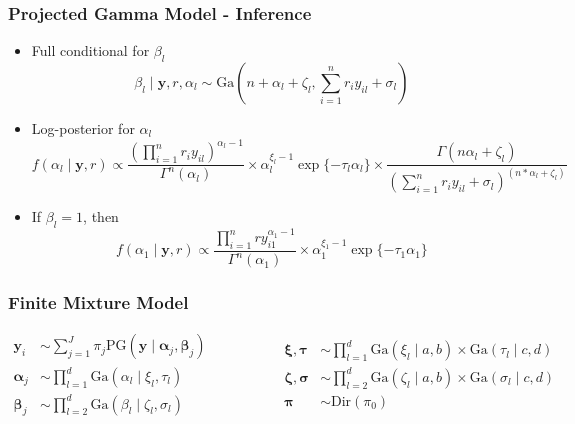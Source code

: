 \documentclass[aspectratio=169]{beamer}
\begin{document}
\begin{frame}
  \frametitle{Projected Gamma Model - Inference}
  \begin{itemize}
    \item Full conditional for $\beta_l$
      \begin{equation*}
        \beta_l\mid \bm{ y}, r, \alpha_l \sim \text{Ga}\left(n + \alpha_l + \zeta_l,
                {\textstyle \sum}_{i = 1}^nr_iy_{il} + \sigma_l\right)
      \end{equation*}
    \pause
    \item Log-posterior for $\alpha_l$
      \begin{equation*}
        f(\alpha_l \mid \bm{ y}, r) \propto
          \frac{\left({\textstyle \prod}_{i = 1}^nr_iy_{il}\right)^{\alpha_l - 1}}{
            \Gamma^n(\alpha_l)} \times \alpha_l^{\xi_l - 1}\exp\{-\tau_l\alpha_l\} \times
            \frac{\Gamma(n\alpha_l + \zeta_l)}{
            \left({\textstyle\sum}_{i = 1}^n r_iy_{il} + \sigma_l
                  \right)^{(n * \alpha_l + \zeta_l)}}
      \end{equation*}
    \pause
    \item If $\beta_l = 1$, then
    \begin{equation*}
      f(\alpha_1 \mid \bm{ y}, r) \propto
        \frac{{\textstyle\prod}_{i = 1}^n ry_{i1}^{\alpha_1 - 1}}{\Gamma^n(\alpha_1)} \times
        \alpha_1^{\xi_1 - 1}\exp\{-\tau_1\alpha_1\}
    \end{equation*}
  \end{itemize}
\end{frame}

\begin{frame}
  \frametitle{Finite Mixture Model}
  \begin{equation*}
    \begin{aligned}
      \bm{ y}_i &\sim \sum_{j = 1}^J\pi_j\text{PG}\left(\bm{ y}\mid \bm{ \alpha}_j, \bm{ \beta}_j\right)\\
      \bm{ \alpha}_j &\sim {\textstyle \prod}_{l = 1}^d \text{Ga}\left(\alpha_l\mid\xi_l,\tau_l\right)\\
      \bm{ \beta}_j &\sim {\textstyle \prod}_{l = 2}^d \text{Ga}\left(\beta_l\mid\zeta_l,\sigma_l\right)
    \end{aligned}
    \hspace{2cm}
    \begin{aligned}
      \bm{ \xi},\bm{\tau} &\sim {\textstyle \prod}_{l = 1}^d \text{Ga}(\xi_l\mid a,b)
                \times \text{Ga}(\tau_l\mid c,d)\\
      \bm{ \zeta},\bm{\sigma} &\sim {\textstyle\prod}_{l = 2}^d\text{Ga}(\zeta_l \mid a,b)
              \times \text{Ga}(\sigma_l\mid c,d)\\
      \bm{ \pi} &\sim \text{Dir}(\pi_0)
    \end{aligned}
  \end{equation*}
\end{frame}
\end{document}
